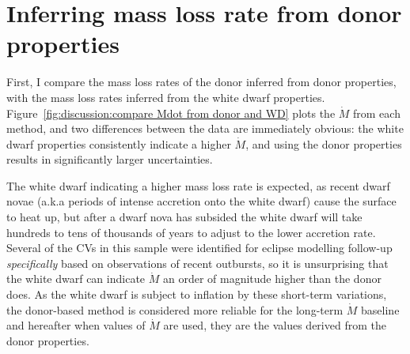 \section{Inferring mass loss rate from donor properties}
\label{sect:discussion:evolutionary modelling}

First, I compare the mass loss rates of the donor inferred from donor properties, with the mass loss rates inferred from the white dwarf properties. Figure~\ref{fig:discussion:compare Mdot from donor and WD} plots the $\dot M$ from each method, and two differences between the data are immediately obvious: the white dwarf properties consistently indicate a higher $\dot M$, and using the donor properties results in significantly larger uncertainties.

The white dwarf indicating a higher mass loss rate is expected, as recent dwarf novae (a.k.a periods of intense accretion onto the white dwarf) cause the surface to heat up, but after a dwarf nova has subsided the white dwarf will take hundreds to tens of thousands of years to adjust to the lower accretion rate.
Several of the CVs in this sample were identified for eclipse modelling follow-up \textit{specifically} based on observations of recent outbursts, so it is unsurprising that the white dwarf can indicate $\dot M$ an order of magnitude higher than the donor does. As the white dwarf is subject to inflation by these short-term variations, the donor-based method is considered more reliable for the long-term $\dot M$ baseline and hereafter when values of $\dot M$ are used, they are the values derived from the donor properties.
